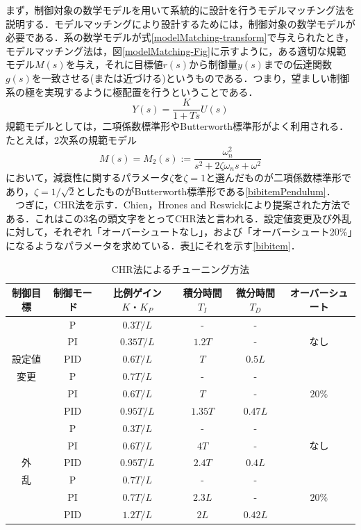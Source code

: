 \documentclass[12pt]{jsarticle}
\begin{document}
\begin{description}
まず，制御対象の数学モデルを用いて系統的に設計を行うモデルマッチング法を説明する．モデルマッチングにより設計するためには，制御対象の数学モデルが必要である．系の数学モデルが式\ref{modelMatching-transform}で与えられたとき，モデルマッチング法は，図\ref{modelMatching-Fig}に示すように，ある適切な規範モデル$M(s)$を与え，それに目標値$r(s)$から制御量$y(s)$までの伝達関数$g(s)$を一致させる(または近づける)というものである．つまり，望ましい制御系の極を実現するように極配置を行うということである．\\
\begin{equation}
  \label{modelMatching-transform}
  Y(s) = \frac{K}{1+Ts}U(s)
\end{equation}
規範モデルとしては，二項係数標準形やButterworth標準形がよく利用される．たとえば，2次系の規範モデル
\begin{equation}
  \label{modelMatching-teachmodel}
  M(s) = M_2(s) := \frac{\omega_n^2}{s^2 + 2\zeta \omega_ns + \omega^2}
\end{equation}
において，減衰性に関するパラメータ$\zeta$を$\zeta=1$と選んだものが二項係数標準形であり，$\zeta=1/\sqrt{2}$としたものがButterworth標準形である\ref{bibitemPendulum}．\\
　つぎに，CHR法を示す．Chien，Hrones and Reswickにより提案された方法である．これはこの3名の頭文字をとってCHR法と言われる．設定値変更及び外乱に対して，それぞれ「オーバーシュートなし」，および「オーバーシュート20\%」になるようなパラメータを求めている．表\ref{CHR-tuning}にそれを示す\ref{bibitem}．
\begin{table}[tb]
  \begin{center}
    \label{CHR-tuning}
    \caption{CHR法によるチューニング方法}
    \begin{tabular}{|c|c|c|c|c|c|} \hline
      制御目標 & 制御モード & 比例ゲイン$K・K_P$ & 積分時間$T_I$ & 微分時間$T_D$ & オーバーシュート \\ \hline \hline
       & P & $0.3T/L$ & - & - & \\
       & PI & $0.35T/L$ & $1.2T$ & - & なし\\
       設定値 & PID & $0.6T/L$ & $T$ & $0.5L$ &\\ \cline{2-6}
       変更 & P & $0.7T/L$ & - & - & \\
       & PI & $0.6T/L$ & $T$ & - & $20\%$\\
       & PID & $0.95T/L$ & $1.35T$ & $0.47L$ &\\ \hline
       & P & $0.3T/L$ & - & - & \\
       & PI & $0.6T/L$ & $4T$ & - & なし\\
       外 & PID & $0.95T/L$ & $2.4T$ & $0.4L$ &\\ \cline{2-6}
       乱 & P & $0.7T/L$ & - & - & \\
       & PI & $0.7T/L$ & $2.3L$ & - & $20\%$\\
       & PID & $1.2T/L$ & $2L$ & $0.42L$ &\\ \hline
    \end{tabular}
  \end{center}
\end{table}
\end{description}
\end{document}
